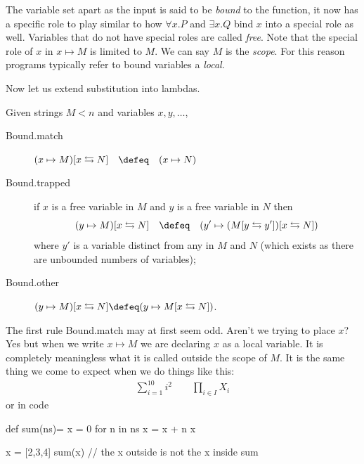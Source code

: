 The variable set apart as the input is said to
be \emph{bound} to the function, it now has a specific role to play similar to
how $\forall x.P$  and $\exists x.Q$ bind $x$ into a special role as well.
Variables that do not have special roles are called \emph{free}.  Note that the
special role of $x$ in $x\mapsto M$ is limited to $M$.  We can say $M$ is the
\emph{scope}.  For this reason programs typically refer to bound variables a
\emph{local}.

Now let us extend substitution into lambdas.
\begin{definition}
Given strings $M<n$ and variables $x,y,\ldots$,
\begin{description}
    \item[Bound.match] $(x\mapsto M)[x\leftrightarrows N]\quad \defeq\quad (x\mapsto N)$
    \item[Bound.trapped]
    if $x$ is a free variable in $M$ and $y$ is a free variable in $N$ then 
    \[ 
        (y\mapsto M)[x\leftrightarrows N]
        \quad \defeq\quad (y'\mapsto (M[y\leftrightarrows y'])[x\leftrightarrows N])
    \]
    where 
    $y'$ is a variable distinct from any in $M$ and $N$ (which exists 
    as there are unbounded numbers of variables);

    \item[Bound.other] $(y\mapsto M)[x\leftrightarrows N]\defeq (y\mapsto M[x\leftrightarrows N])$.
\end{description}
\end{definition}

The first rule Bound.match may at first seem odd.  Aren't we trying to place $x$?
Yes but when we write $x\mapsto M$ we are declaring $x$ as a local variable.  
It is completely meaningless what it is called outside the scope of $M$.
It is the same thing we come to expect when we do things like this:
\begin{align*}
    \sum_{i=1}^{10} i^2 \qquad \prod_{i\in I}X_i 
\end{align*}
or in code 
\begin{center}
\begin{Pcode}[]
def sum(ns)= {
  x = 0
  for n in ns 
    x = x + n
  x  
}

x = [2,3,4]
sum(x)  // the x outside is not the x inside sum
\end{Pcode}
\end{center}